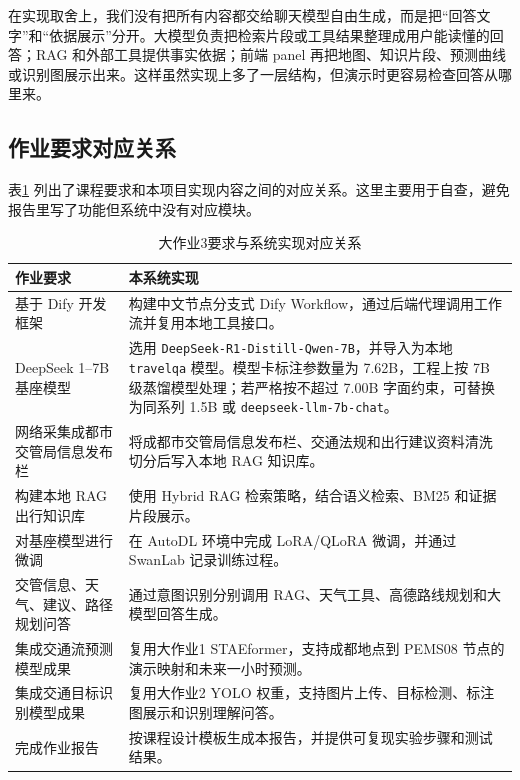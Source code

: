\documentclass[bwprint]{report}
\begin{document}
在实现取舍上，我们没有把所有内容都交给聊天模型自由生成，而是把``回答文字''和``依据展示''分开。大模型负责把检索片段或工具结果整理成用户能读懂的回答；RAG 和外部工具提供事实依据；前端 panel 再把地图、知识片段、预测曲线或识别图展示出来。这样虽然实现上多了一层结构，但演示时更容易检查回答从哪里来。

\subsection{作业要求对应关系}
表\ref{tab:requirement-mapping} 列出了课程要求和本项目实现内容之间的对应关系。这里主要用于自查，避免报告里写了功能但系统中没有对应模块。

\begin{table}[H]
    \caption{大作业3要求与系统实现对应关系}
    \label{tab:requirement-mapping}
    \centering
    \small
    \begin{tabular}{p{}p{}}
        \toprule[1.5pt]
        作业要求 & 本系统实现 \\
        \midrule[1pt]
        基于 Dify 开发框架 & 构建中文节点分支式 Dify Workflow，通过后端代理调用工作流并复用本地工具接口。 \\
        DeepSeek 1--7B 基座模型 & 选用 \texttt{DeepSeek-R1-Distill-Qwen-7B}，并导入为本地 \texttt{travelqa} 模型。模型卡标注参数量为 7.62B，工程上按 7B 级蒸馏模型处理；若严格按不超过 7.00B 字面约束，可替换为同系列 1.5B 或 \texttt{deepseek-llm-7b-chat}。 \\
        网络采集成都市交管局信息发布栏 & 将成都市交管局信息发布栏、交通法规和出行建议资料清洗切分后写入本地 RAG 知识库。 \\
        构建本地 RAG 出行知识库 & 使用 Hybrid RAG 检索策略，结合语义检索、BM25 和证据片段展示。 \\
        对基座模型进行微调 & 在 AutoDL 环境中完成 LoRA/QLoRA 微调，并通过 SwanLab 记录训练过程。 \\
        交管信息、天气、建议、路径规划问答 & 通过意图识别分别调用 RAG、天气工具、高德路线规划和大模型回答生成。 \\
        集成交通流预测模型成果 & 复用大作业1 STAEformer，支持成都地点到 PEMS08 节点的演示映射和未来一小时预测。 \\
        集成交通目标识别模型成果 & 复用大作业2 YOLO 权重，支持图片上传、目标检测、标注图展示和识别理解问答。 \\
        完成作业报告 & 按课程设计模板生成本报告，并提供可复现实验步骤和测试结果。 \\
        \bottomrule[1.5pt]
    \end{tabular}
\end{table}
\end{document}
